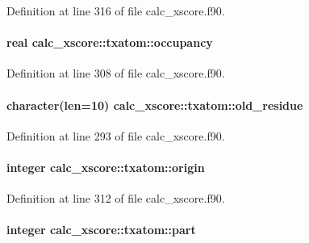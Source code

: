 Definition at line 316 of file calc\-\_\-xscore.\-f90.

\hypertarget{structcalc__xscore_1_1txatom_a89a14de91737dd71bdc641b29025b3a3}{
\paragraph[{occupancy}]{\setlength{\rightskip}{0pt plus 5cm}real calc\-\_\-xscore\-::txatom\-::occupancy}}\label{structcalc__xscore_1_1txatom_a89a14de91737dd71bdc641b29025b3a3}


Definition at line 308 of file calc\-\_\-xscore.\-f90.

\hypertarget{structcalc__xscore_1_1txatom_a2c94dcbe2026d4027020265ce2dab0ad}{
\paragraph[{old\-\_\-residue}]{\setlength{\rightskip}{0pt plus 5cm}character(len=10) calc\-\_\-xscore\-::txatom\-::old\-\_\-residue}}\label{structcalc__xscore_1_1txatom_a2c94dcbe2026d4027020265ce2dab0ad}


Definition at line 293 of file calc\-\_\-xscore.\-f90.

\hypertarget{structcalc__xscore_1_1txatom_a3d1e346ecaeb1ce3cb51991a3e81f99c}{
\paragraph[{origin}]{\setlength{\rightskip}{0pt plus 5cm}integer calc\-\_\-xscore\-::txatom\-::origin}}\label{structcalc__xscore_1_1txatom_a3d1e346ecaeb1ce3cb51991a3e81f99c}


Definition at line 312 of file calc\-\_\-xscore.\-f90.

\hypertarget{structcalc__xscore_1_1txatom_aaec30922d58c5fd22adf45fb3b015d02}{
\paragraph[{part}]{\setlength{\rightskip}{0pt plus 5cm}integer calc\-\_\-xscore\-::txatom\-::part}}\label{structcalc__xscore_1_1txatom_aaec30922d58c5fd22adf45fb3b015d02}


